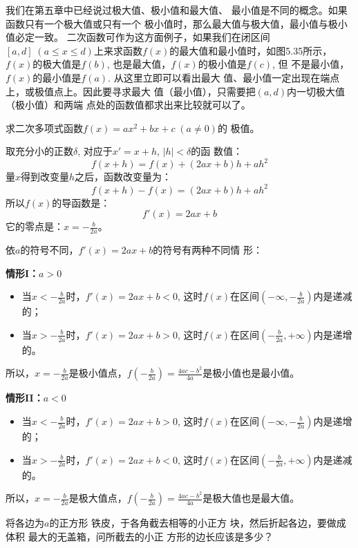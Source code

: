 我们在第五章中已经说过极大值、极小值和最大值、
最小值是不同的概念。如果函数只有一个极大值或只有一个
极小值时，那么最大值与极大值，最小值与极小值必定一致。
二次函数可作为这方面例子，如果我们在闭区间$[a,d]\; (a\le 
x\le d)$上来求函数$f(x)$的最大值和最小值时，如图5.35所示，
$f(x)$的极大值是$f(b)$, 也是最大值，$f(x)$的极小值是$f(c)$, 但
不是最小值，$f(x)$的最小值是$f(a)$. 从这里立即可以看出最大
值、最小值一定出现在端点上，或极值点上。因此要寻求最大
值（最小值），只需要把$(a,d)$内一切极大值（极小值）和两端
点处的函数值都求出来比较就可以了。

\begin{example}
    求二次多项式函数$f(x)=ax^2+bx+c\; (a\ne 0)$的
    极值。  
\end{example}

\begin{solution}
取充分小的正数$\delta$, 对应于$x'=x+h$, $|h|<\delta$的函
数值：
\[f(x+h)=f(x)+(2ax+b)h+ah^2\]
量$x$得到改变量$h$之后，函数改变量为：
\[f(x+h)-f(x)=(2ax+b)h+ah^2\]
所以$f(x)$的导函数是：
\[f'(x)=2ax+b\]
它的零点是：$x=-\frac{b}{2a}$。

依$a$的符号不同，$f'(x)=2ax+b$的符号有两种不同情
形：

\textbf{情形I：$a>0$}
\begin{itemize}
    \item 当$x<-\frac{b}{2a}$时，$f'(x)=2ax+b<0$, 这时$f(x)$在区间$\left(-\infty,-\frac{b}{2a}\right)$内是递减的；
    \item 当$x>-\frac{b}{2a}$时，$f'(x)=2ax+b>0$, 这时$f(x)$在区间$\left(-\frac{b}{2a},+\infty\right)$内是递增的。
\end{itemize}

所以，$x=-\frac{b}{2a}$是极小值点，$f\left(-\frac{b}{2a}\right)=\frac{4ac-b^2}{4a}$是极小值也是最小值。

\textbf{情形II：$a<0$}
\begin{itemize}
    \item 当$x<-\frac{b}{2a}$时，$f'(x)=2ax+b>0$, 这时$f(x)$在区间$\left(-\infty,-\frac{b}{2a}\right)$内是递增的；
    \item 当$x>-\frac{b}{2a}$时，$f'(x)=2ax+b<0$, 这时$f(x)$在区间$\left(-\frac{b}{2a},+\infty\right)$内是递减的。
\end{itemize}

所以，$x=-\frac{b}{2a}$是极大值点，$f\left(-\frac{b}{2a}\right)=\frac{4ac-b^2}{4a}$是极大值也是最大值。
\end{solution}


\begin{example}
将各边为$a$的正方形
铁皮，于各角截去相等的小正方
块，然后折起各边，要做成体积
最大的无盖箱，问所截去的小正
方形的边长应该是多少？
\end{example}

